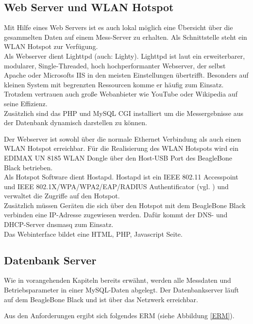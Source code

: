 \subsection{Web Server und WLAN Hotspot}
\label{section_WebServerWLANHotspot}

Mit Hilfe eines Web Servers ist es auch lokal möglich eine Übersicht über die gesammelten Daten auf einem Mess-Server zu erhalten. Als Schnittstelle steht ein WLAN Hotspot zur Verfügung.\\

Als Webserver dient Lighttpd (auch: Lighty). Lighttpd ist laut \cite{bogus2008lighttpd} ein erweiterbarer, modularer, Single-Threaded, hoch hochperformanter Webserver, der selbst Apache oder Microsofts IIS in den meisten Einstellungen übertrifft. Besonders auf kleinen System mit begrenzten Ressourcen komme er häufig zum Einsatz. Trotzdem vertrauen auch große Webanbieter wie YouTube oder Wikipedia auf seine Effizienz.\\
Zusätzlich sind das PHP und MySQL \ac{CGI} installiert um die Messergebnisse aus der Datenbank dynamisch darstellen zu können. 

Der Webserver ist sowohl über die normale Ethernet Verbindung als auch einen WLAN Hotspot erreichbar. Für die Realisierung des WLAN Hotspots wird ein EDIMAX UN 8185 WLAN Dongle über den Host-USB Port des BeagleBone Black betrieben.\\
Als Hotspot Software dient Hostapd. Hostapd ist ein IEEE 802.11 Accesspoint und IEEE 802.1X/WPA/WPA2/EAP/RADIUS Authentificator (vgl. \cite{LinuxWireless}) und verwaltet die Zugriffe auf den Hotspot.\\
Zusätzlich müssen Geräten die sich über den Hotspot mit dem BeagleBone Black verbinden eine IP-Adresse zugewiesen werden. Dafür kommt der DNS- und DHCP-Server dnsmasq zum Einsatz.\\

Das Webinterface bildet eine HTML, PHP, Javascript Seite.
\newpage
 
\subsection{Datenbank Server}
\label{section_EntwurfDatenbank}

Wie in vorangehenden Kapiteln bereits erwähnt, werden alle Messdaten und Betriebsparameter in einer MySQL-Daten abgelegt. Der Datenbankserver läuft auf dem BeagleBone Black und ist über das Netzwerk erreichbar.

Aus den Anforderungen ergibt sich folgendes \ac{ERM} (siehe Abbildung \ref{ERM}). \\

